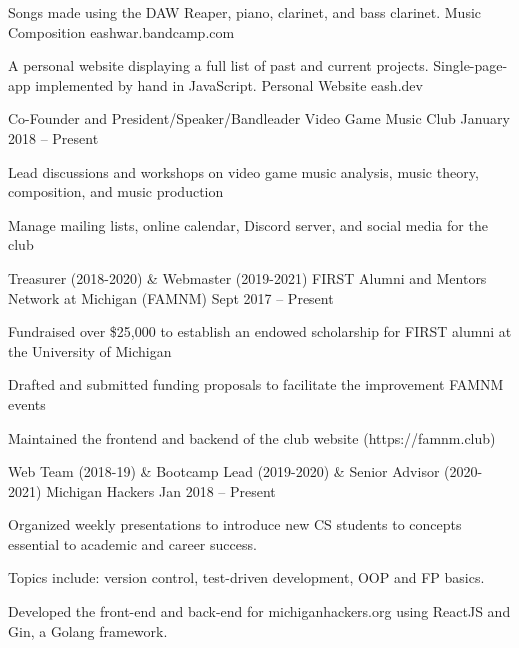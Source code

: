 \documentclass[]{awesome-cv}
\begin{document}
	\vspace{-6mm}
	\cventry
	{Songs made using the DAW Reaper, piano, clarinet, and bass clarinet.}
	{Music Composition}
	{eashwar.bandcamp.com}
	{}
	{}
	
	\vspace{-6mm}
	\cventry
	{A personal website displaying a full list of past and current projects. Single-page-app implemented by hand in JavaScript.}
	{Personal Website}
	{eash.dev}
	{}
	{}
	
	\vspace{-5mm}

\vspace{-2mm}
\vspace{-2mm}
	\cventry
	{Co-Founder and President/Speaker/Bandleader}
	{Video Game Music Club}
	{}
	{January 2018 – Present}
	{\begin{cvitems}
		\item {Lead discussions and workshops on video game music analysis, music theory, composition, and music production}
		\item {Manage mailing lists, online calendar, Discord server, and social media for the club}
		\end{cvitems}}

	\vspace{-4mm}
	\cventry
	{Treasurer (2018-2020) \& Webmaster (2019-2021)}
	{FIRST Alumni and Mentors Network at Michigan (FAMNM)}
	{}
	{Sept 2017 – Present}
	{\begin{cvitems}
		\item {Fundraised over \$25,000 to establish an endowed scholarship for FIRST alumni at the University of Michigan}
		\item {Drafted and submitted funding proposals to facilitate the improvement FAMNM events}
		\item {Maintained the frontend and backend of the club website (https://famnm.club)}
		\end{cvitems}}
	
	\vspace{-4mm}
	\cventry
	{Web Team (2018-19) \& Bootcamp Lead (2019-2020) \& Senior Advisor (2020-2021)}
	{Michigan Hackers}
	{}
	{Jan 2018 – Present}
	{\begin{cvitems}
		\item {Organized weekly presentations to introduce new CS students to concepts essential to academic and career success.}
		\item {Topics include: version control, test-driven development, OOP and FP basics.}
		\item {Developed the front-end and back-end for michiganhackers.org using ReactJS and Gin, a Golang framework.}
		\end{cvitems}}
	\vspace{-4mm}
\end{document}
